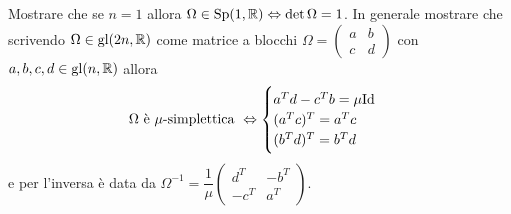 \begin{exercise}
    Mostrare che se $ n = 1 $ allora $ \Omega \in \mathrm{Sp}(1, \mathbb{R}) \Leftrightarrow \det{\Omega} = 1 $. In generale mostrare che scrivendo $ \Omega \in \mathrm{gl}(2n, \mathbb{R}) $ come matrice a blocchi $ \Omega = \begin{pmatrix} a & b \\ c & d \end{pmatrix} $ con $ a, b, c, d \in \mathrm{gl}(n, \mathbb{R}) $ allora
    \[
    \Omega \text{ è $ \mu $-simplettica } \Leftrightarrow
    \begin{cases}
        a^T d - c^T b = \mu \mathrm{Id} \\
        (a^T c)^T = a^T c \\
        (b^T d)^T = b^T d
    \end{cases}
    \]
    e per l'inversa è data da $ \Omega^{-1} = \dfrac{1}{\mu} \begin{pmatrix} d^T & -b^T \\ -c^T & a^T \end{pmatrix} $.
\end{exercise}
